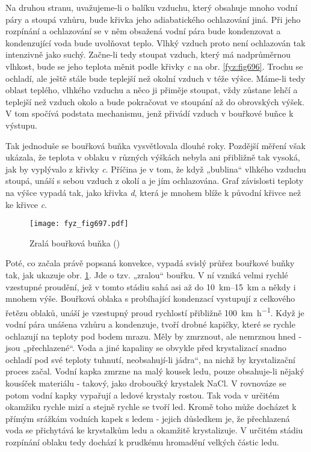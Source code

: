     Na druhou stranu, uvažujeme-li o balíku vzduchu, který obsahuje mnoho vodní páry a stoupá
    vzhůru, bude křivka jeho adiabatického ochlazování jiná. Při jeho rozpínání a ochlazování se v
    něm obsažená vodní pára bude kondenzovat a kondenzující voda bude uvolňovat teplo. Vlhký vzduch
    proto není ochlazován tak intenzivně jako suchý. Začne-li tedy stoupat vzduch, který má
    nadprůměrnou vlhkost, bude se jeho teplota měnit podle křivky \emph{c} na obr. \ref{fyz:fig696}.
    Trochu se ochladí, ale ještě stále bude teplejší než okolní vzduch v téže výšce. Máme-li tedy
    oblast teplého, vlhkého vzduchu a něco ji přiměje stoupat, vždy zůstane lehčí a teplejší než
    vzduch okolo a bude pokračovat ve stoupání až do obrovských výšek. V tom spočívá podstata
    mechanismu, jenž přivádí vzduch v bouřkové buňce k výstupu.

    Tak jednoduše se bouřková buňka vysvětlovala dlouhé roky. Pozdější měření však ukázala, že
    teplota v oblaku v různých výškách nebyla ani přibližně tak vysoká, jak by vyplývalo z křivky
    \emph{c}. Příčina je v tom, že když „bublina“ vlhkého vzduchu stoupá, unáší s sebou vzduch z
    okolí a je jím ochlazována. Graf závislosti teploty na výšce vypadá tak, jako křivka \emph{d},
    která je mnohem blíže k původní křivce než ke křivce \emph{c}.

    \begin{figure}[ht!] %
      \centering
      \texttt{[image: fyz\_fig697.pdf]}
      \caption{Zralá bouřková buňka (\cite[s.~707]{Feynman02})}
      \label{fyz:fig697}
    \end{figure}

    Poté, co začala právě popsaná konvekce, vypadá svislý průřez bouřkové buňky tak, jak ukazuje
    obr. \ref{fyz:fig697}. Jde o tzv. „zralou“ bouřku. V ní vzniká velmi rychlé vzestupné proudění,
    jež v tomto stádiu sahá asi až do \SIrange{10}{15}{\km} a někdy i mnohem výše. Bouřková oblaka s
    probíhající kondenzací vystupují z celkového řetězu oblaků, unáší je vzestupný proud rychlostí
    přibližně \SI{100}{\km\per\hour}. Když je vodní pára unášena vzhůru a kondenzuje, tvoří drobné
    kapičky, které se rychle ochlazují na teploty pod bodem mrazu. Měly by zmrznout, ale nemrznou
    hned - jsou „přechlazené“. Voda a jiné kapaliny se obvykle před krystalizací snadno ochladí pod
    své teploty tuhnutí, neobsahují-li jádra“, na nichž by krystalizační proces začal. Vodní kapka
    zmrzne na malý kousek ledu, pouze obsahuje-li nějaký kousíček materiálu - takový, jako droboučký
    krystalek NaCl. V rovnováze se potom vodní kapky vypařují a ledové krystaly rostou. Tak voda v
    určitém okamžiku rychle mizí a stejně rychle se tvoří led. Kromě toho může docházet k přímým
    srážkám vodních kapek s ledem - jejich důsledkem je, že přechlazená voda se přichytává ke
    krystalkům ledu a okamžitě krystalizuje. V určitém stádiu rozpínání oblaku tedy dochází k
    prudkému hromadění velkých částic ledu.

